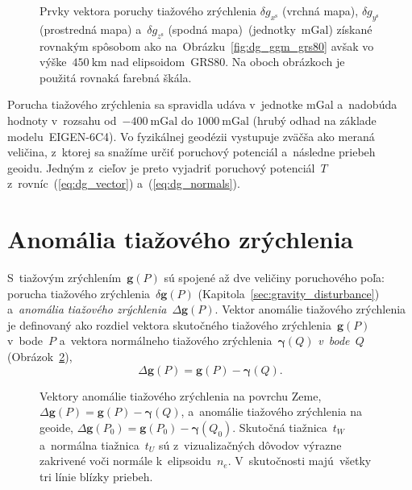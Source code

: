\documentclass[a4paper, 12pt]{book}
\let\vec\mathbf
\begin{document}
\begin{figure}
\caption{Prvky vektora poruchy tiažového zrýchlenia $\delta g_{x^\mathrm{s}}$ 
(vrchná mapa), $\delta g_{y^\mathrm{s}}$ (prostredná mapa) a~$\delta 
g_{z^\mathrm{s}}$ (spodná mapa)~(jednotky~$\mathrm{mGal}$) získané rovnakým 
spôsobom ako na~Obrázku~\ref{fig:dg_ggm_grs80} avšak vo výške~$450\ 
\mathrm{km}$ nad elipsoidom~GRS80.  Na oboch obrázkoch je použitá rovnaká 
farebná škála.}
\label{fig:dg_ggm_450km}
\end{figure}

Porucha tiažového zrýchlenia sa spravidla udáva v~jednotke mGal a~nadobúda 
hodnoty v~rozsahu od~$-400\ \mathrm{mGal}$ do $1000\ \mathrm{mGal}$ (hrubý 
odhad na základe modelu~EIGEN-6C4).  Vo fyzikálnej geodézii vystupuje zväčša 
ako meraná veličina, z~ktorej sa snažíme určiť poruchový potenciál a~následne 
priebeh geoidu.  Jedným z~cieľov je preto vyjadriť poruchový potenciál~$T$ 
z~rovníc~(\ref{eq:dg_vector}) a~(\ref{eq:dg_normals}).





\section{Anomália tiažového zrýchlenia}
\label{sec:gravity_anomaly}

S~tiažovým zrýchlením~$\vec g(P)$ sú spojené až dve veličiny poruchového poľa: 
porucha tiažového zrýchlenia~$\delta \vec g(P)$ 
(Kapitola~\ref{sec:gravity_disturbance}) a~\emph{anomália tiažového 
zrýchlenia}~$\Delta \vec g(P)$.  Vektor anomálie tiažového zrýchlenia je 
definovaný ako rozdiel vektora skutočného tiažového zrýchlenia~$\vec g(P)$ 
v~bode~$P$ a~vektora normálneho tiažového zrýchlenia~$\boldsymbol\gamma(Q)$ 
\emph{v~bode~$Q$} (Obrázok~\ref{fig:gravity_anomaly}),
%
\begin{equation}
\label{eq:Dg_vector_earth}
\Delta \vec g(P) = \vec g(P) - \boldsymbol\gamma (Q).
\end{equation}

\begin{figure}[bt]
\centering

\caption{Vektory anomálie tiažového zrýchlenia na povrchu Zeme,~$\Delta \vec 
g(P) = \vec g(P) - \boldsymbol \gamma(Q)$, a~anomálie tiažového zrýchlenia na 
geoide, $\Delta \vec g(P_0) = \vec g(P_0) - \boldsymbol\gamma(Q_0)$.  Skutočná 
tiažnica~$t_W$ a~normálna tiažnica~$t_U$ sú z~vizualizačných dôvodov výrazne 
zakrivené voči normále k~elipsoidu~$n_e$.  V~skutočnosti majú~všetky tri línie 
blízky priebeh.}
\label{fig:gravity_anomaly}
\end{figure}
\end{document}
